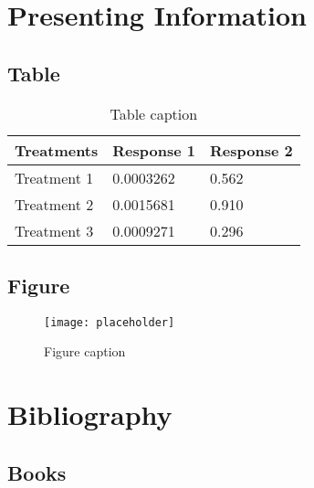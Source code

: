 \documentclass[11pt,fleqn]{book} %
\begin{document}


\chapter{Presenting Information}

\section{Table}

\begin{table}[h]
\centering
\begin{tabular}{l l l}
\toprule
\textbf{Treatments} & \textbf{Response 1} & \textbf{Response 2}\\
\midrule
Treatment 1 & 0.0003262 & 0.562 \\
Treatment 2 & 0.0015681 & 0.910 \\
Treatment 3 & 0.0009271 & 0.296 \\
\bottomrule
\end{tabular}
\caption{Table caption}
\end{table}


\section{Figure}

\begin{figure}[h]
\centering\texttt{[image: placeholder]}
\caption{Figure caption}
\end{figure}


\chapter*{Bibliography}
\section*{Books}
\printbibliography[heading=bibempty,type=book]
\end{document}
